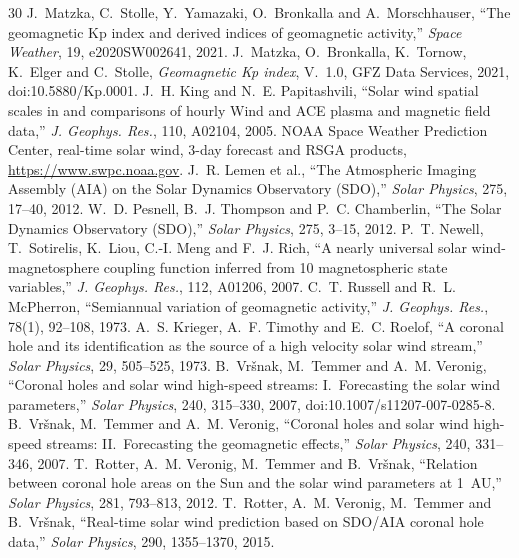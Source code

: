 \documentclass[11pt,a4paper]{article}
\begin{document}
{\small
\begin{thebibliography}{30}\setlength{\itemsep}{0pt}
 J.~Matzka, C.~Stolle, Y.~Yamazaki, O.~Bronkalla and A.~Morschhauser, ``The geomagnetic Kp index and derived indices of geomagnetic activity,'' \emph{Space Weather}, 19, e2020SW002641, 2021.
 J.~Matzka, O.~Bronkalla, K.~Tornow, K.~Elger and C.~Stolle, \emph{Geomagnetic Kp index}, V.~1.0, GFZ Data Services, 2021, doi:10.5880/Kp.0001.
 J.~H. King and N.~E. Papitashvili, ``Solar wind spatial scales in and comparisons of hourly Wind and ACE plasma and magnetic field data,'' \emph{J. Geophys. Res.}, 110, A02104, 2005.
 NOAA Space Weather Prediction Center, real-time solar wind, 3-day forecast and RSGA products, \url{https://www.swpc.noaa.gov}.
 J.~R. Lemen et al., ``The Atmospheric Imaging Assembly (AIA) on the Solar Dynamics Observatory (SDO),'' \emph{Solar Physics}, 275, 17--40, 2012.
 W.~D. Pesnell, B.~J. Thompson and P.~C. Chamberlin, ``The Solar Dynamics Observatory (SDO),'' \emph{Solar Physics}, 275, 3--15, 2012.
 P.~T. Newell, T.~Sotirelis, K.~Liou, C.-I. Meng and F.~J. Rich, ``A nearly universal solar wind-magnetosphere coupling function inferred from 10 magnetospheric state variables,'' \emph{J. Geophys. Res.}, 112, A01206, 2007.
 C.~T. Russell and R.~L. McPherron, ``Semiannual variation of geomagnetic activity,'' \emph{J. Geophys. Res.}, 78(1), 92--108, 1973.
 A.~S. Krieger, A.~F. Timothy and E.~C. Roelof, ``A coronal hole and its identification as the source of a high velocity solar wind stream,'' \emph{Solar Physics}, 29, 505--525, 1973.
 B.~Vr\v{s}nak, M.~Temmer and A.~M. Veronig, ``Coronal holes and solar wind high-speed streams: I.~Forecasting the solar wind parameters,'' \emph{Solar Physics}, 240, 315--330, 2007, doi:10.1007/s11207-007-0285-8.
 B.~Vr\v{s}nak, M.~Temmer and A.~M. Veronig, ``Coronal holes and solar wind high-speed streams: II.~Forecasting the geomagnetic effects,'' \emph{Solar Physics}, 240, 331--346, 2007.
 T.~Rotter, A.~M. Veronig, M.~Temmer and B.~Vr\v{s}nak, ``Relation between coronal hole areas on the Sun and the solar wind parameters at 1~AU,'' \emph{Solar Physics}, 281, 793--813, 2012.
 T.~Rotter, A.~M. Veronig, M.~Temmer and B.~Vr\v{s}nak, ``Real-time solar wind prediction based on SDO/AIA coronal hole data,'' \emph{Solar Physics}, 290, 1355--1370, 2015.

\end{thebibliography}}
\end{document}
